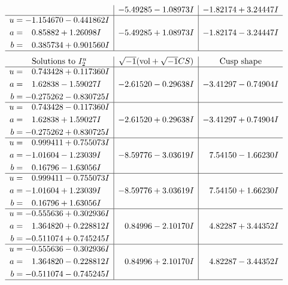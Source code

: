 \documentclass[1p]{elsarticle_modified}
\theoremstyle{definition}
\newcommand{\I}{\sqrt{-1}}
\begin{document}
$$\begin{array}{c|c|c}
 & -5.49285 - 1.08973 I & -1.82174 + 3.24447 I \\ \hline\begin{aligned}
u &= -1.154670 - 0.441862 I \\
a &= \phantom{-}0.85882 + 1.26098 I \\
b &= \phantom{-}0.385734 + 0.901560 I\end{aligned}
 & -5.49285 + 1.08973 I & -1.82174 - 3.24447 I\\
 \hline 
 \end{array}$$\newpage$$\begin{array}{c|c|c}  
\text{Solutions to }I^u_{2}& \I (\text{vol} + \sqrt{-1}CS) & \text{Cusp shape}\\
 \hline 
\begin{aligned}
u &= \phantom{-}0.743428 + 0.117360 I \\
a &= \phantom{-}1.62838 - 1.59027 I \\
b &= -0.275262 - 0.830725 I\end{aligned}
 & -2.61520 - 0.29638 I & -3.41297 - 0.74904 I \\ \hline\begin{aligned}
u &= \phantom{-}0.743428 - 0.117360 I \\
a &= \phantom{-}1.62838 + 1.59027 I \\
b &= -0.275262 + 0.830725 I\end{aligned}
 & -2.61520 + 0.29638 I & -3.41297 + 0.74904 I \\ \hline\begin{aligned}
u &= \phantom{-}0.999411 + 0.755073 I \\
a &= -1.01604 - 1.23039 I \\
b &= \phantom{-}0.16796 - 1.63056 I\end{aligned}
 & -8.59776 - 3.03619 I & \phantom{-}7.54150 - 1.66230 I \\ \hline\begin{aligned}
u &= \phantom{-}0.999411 - 0.755073 I \\
a &= -1.01604 + 1.23039 I \\
b &= \phantom{-}0.16796 + 1.63056 I\end{aligned}
 & -8.59776 + 3.03619 I & \phantom{-}7.54150 + 1.66230 I \\ \hline\begin{aligned}
u &= -0.555636 + 0.302936 I \\
a &= \phantom{-}1.364820 + 0.228812 I \\
b &= -0.511074 + 0.745245 I\end{aligned}
 & \phantom{-}0.84996 - 2.10170 I & \phantom{-}4.82287 + 3.44352 I \\ \hline\begin{aligned}
u &= -0.555636 - 0.302936 I \\
a &= \phantom{-}1.364820 - 0.228812 I \\
b &= -0.511074 - 0.745245 I\end{aligned}
 & \phantom{-}0.84996 + 2.10170 I & \phantom{-}4.82287 - 3.44352 I\\
 \hline 
 \end{array}$$\newpage
\end{document}
